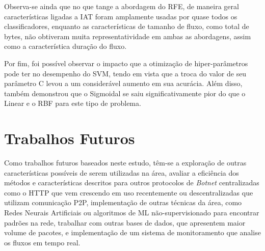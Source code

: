 Observa-se ainda que no que tange a abordagem do RFE, de maneira geral características ligadas a IAT foram amplamente usadas por quase todos os classificadores, enquanto as características de tamanho de fluxo, como total de bytes, não obtiveram muita representatividade em ambas as abordagens, assim como a característica duração do fluxo.

Por fim, foi possível observar o impacto que a otimização de hiper-parâmetros pode ter no desempenho do SVM, tendo em vista que a troca do valor de seu parâmetro C levou a um considerável aumento em sua acurácia. Além disso, também demonstrou que o Sigmoidal se saiu significativamente pior do que o Linear e o RBF para este tipo de problema.

\section{Trabalhos Futuros}

Como trabalhos futuros baseados neste estudo, têm-se a exploração de outras características possíveis de serem utilizadas na área, avaliar a eficiência dos métodos e características descritos para outros protocolos de \textit{Botnet} centralizadas como o HTTP que vem crescendo em uso recentemente ou descentralizadas que utilizam comunicação P2P, implementação de outras técnicas da área, como Redes Neurais Artificiais ou algoritmos de  ML não-supervisionado para encontrar padrões na rede, trabalhar com outras bases de dados, que apresentem maior volume de pacotes, e implementação de um sistema de monitoramento que analise os fluxos em tempo real.